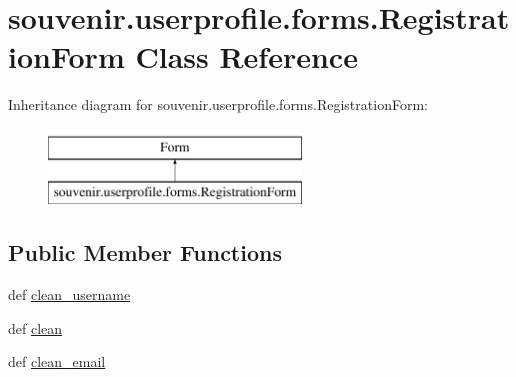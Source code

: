 \hypertarget{classsouvenir_1_1userprofile_1_1forms_1_1RegistrationForm}{\section{souvenir.\-userprofile.\-forms.\-Registration\-Form Class Reference}
\label{classsouvenir_1_1userprofile_1_1forms_1_1RegistrationForm}
}
Inheritance diagram for souvenir.\-userprofile.\-forms.\-Registration\-Form\-:\begin{figure}[H]
\begin{center}
\leavevmode
\includegraphics[height=2.000000cm]{classsouvenir_1_1userprofile_1_1forms_1_1RegistrationForm}
\end{center}
\end{figure}
\subsection*{Public Member Functions}
\begin{DoxyCompactItemize}
\item 
def \hyperlink{classsouvenir_1_1userprofile_1_1forms_1_1RegistrationForm_ae96ae8b4865b6aa20b763ae3c9439313}{clean\-\_\-username}
\item 
def \hyperlink{classsouvenir_1_1userprofile_1_1forms_1_1RegistrationForm_a379dce8ed388ec45046738e79d68351c}{clean}
\item 
def \hyperlink{classsouvenir_1_1userprofile_1_1forms_1_1RegistrationForm_a0e0d9e9b94d359b2165e5d1947db9fd4}{clean\-\_\-email}
\end{DoxyCompactItemize}

